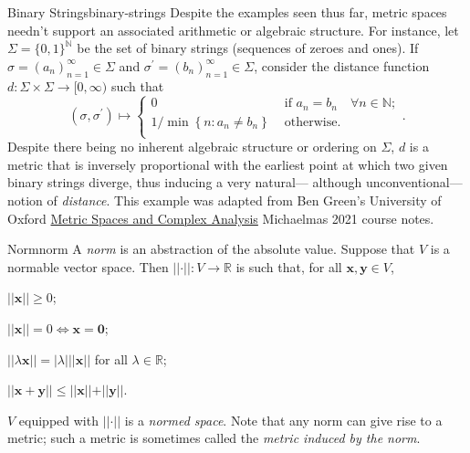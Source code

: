 \documentclass{article}
\renewcommand*\vec{\mathbf}
\numberwithin{equation}{section}
\numberwithin{figure}{section}
\newcommand*\setaxiomprefix[1]{
    \setlist[axioms]{label=#1\arabic*), ref=#1\arabic*}
}
\begin{document}
\begin{example}{Binary Strings}{binary-strings}
    Despite the examples seen thus far, metric spaces needn't support an
    associated arithmetic or algebraic structure. For instance, let $ \Sigma =
    \{ 0, 1 \}^\mathbb{N} $ be the set of binary strings (sequences of zeroes
    and ones). If $ \sigma = \left(a_n\right)_{n=1}^\infty \in \Sigma $ and $
    \sigma^\prime = \left(b_n\right)_{n=1}^\infty \in \Sigma $, consider the
    distance function $ d \colon \Sigma \times \Sigma \to [0, \infty) $ such
    that
    \begin{equation}
        \left(\sigma, \sigma^\prime\right) \mapsto
        \begin{cases}
            0 &\text{ if } a_n = b_n \quad \forall n \in \mathbb{N}; \\
            1/\min\left\{n \colon a_n \neq b_n\right\} &\text{ otherwise.} \\
        \end{cases}.
    \end{equation}
    Despite there being no inherent algebraic structure or ordering on $ \Sigma
    $, $ d $ is a metric that is inversely proportional with the earliest point
    at which two given binary strings diverge, thus inducing a very natural---
    although unconventional---notion of \emph{distance}.
    \tcblower
    This example was adapted from Ben Green's University of Oxford
    \href{https://courses.maths.ox.ac.uk/course/view.php?id=65}{Metric Spaces
    and Complex Analysis} Michaelmas 2021 course notes.
\end{example}
\begin{definition}{Norm}{norm}
    A \emph{norm} is an abstraction of the absolute value. Suppose that $ V $ is
    a normable vector space. Then $ \vert\vert\cdot\vert\vert \colon V \to
    \mathbb{R} $ is such that, for all $ \vec{x}, \vec{y} \in V $,
    \setaxiomprefix{N}
    \begin{axioms}
        \item $ \vert\vert \vec{x} \vert\vert \geq 0 $;
        \item $ \vert\vert \vec{x} \vert\vert = 0 \iff \vec{x} = \vec{0} $;
        \item $ \vert\vert \lambda \vec{x} \vert\vert = \vert \lambda \vert
            \vert\vert \vec{x} \vert\vert $ for all $ \lambda \in \mathbb{R} $;
        \item $ \vert\vert \vec{x} + \vec{y} \vert\vert \leq \vert\vert \vec{x}
            \vert\vert + \vert\vert \vec{y} \vert\vert $.
    \end{axioms}
    $ V $ equipped with $ \vert\vert \cdot \vert\vert $ is a \emph{normed
    space}. Note that any norm can give rise to a metric; such a metric is
    sometimes called the \emph{metric induced by the norm}.
\end{definition}
\end{document}

